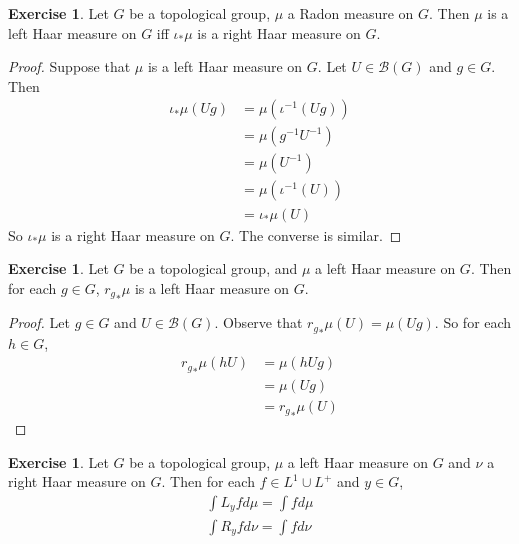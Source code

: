 \documentclass[12pt]{amsart}
\theoremstyle{definition}
\newtheorem{ex}[definition]{Exercise}
\newcommand{\MB}{\mathcal{B}}
\newcommand{\lex}[1]{\label{ex:#1}}
\begin{document}
	\begin{ex} \lex{00000} 
		Let $G$ be a topological group, $\mu$ a Radon measure on $G$. Then $\mu$ is a left Haar measure on $G$ iff $\iota_*\mu$ is a right Haar measure on $G$. 
	\end{ex}
	
	\begin{proof}
		Suppose that $\mu$ is a left Haar measure on $G$. Let $U \in \MB(G)$ and $g \in G$. Then 
		\begin{align*}
			\iota_*\mu(Ug)
			& = \mu(\iota^{-1}(Ug)) \\
			&= \mu (g^{-1}U^{-1}) \\
			&= \mu (U^{-1}) \\
			&= \mu(\iota^{-1}(U)) \\
			&= \iota_*\mu(U)
		\end{align*}
		So $\iota_*\mu$ is a right Haar measure on $G$. The converse is similar.
	\end{proof}

	\begin{ex} \lex{00000} 
		Let $G$ be a topological group, and $\mu$ a left Haar measure on $G$. Then for each $g \in G$, ${r_{g}}_*\mu$ is a left Haar measure on $G$.
	\end{ex}

	\begin{proof}
		Let $g \in G$ and $U \in \MB(G)$. Observe that ${r_{g}}_*\mu(U) = \mu(Ug)$. So for each $h \in G$, 
		\begin{align*}
			{r_{g}}_*\mu(hU) 
			& = \mu(hUg) \\
			& =  \mu(Ug) \\
			& = {r_{g}}_*\mu(U)
		\end{align*}
	\end{proof}
	
	\begin{ex} \lex{00000} 
		Let $G$ be a topological group, $\mu$ a left Haar measure on $G$ and $\nu$ a right Haar measure on $G$. Then for each $f \in L^1 \cup L^+$ and $y \in G$, 
		\begin{align}
			\int L_y f d\mu = \int f d\mu \\
			\int R_y f d\nu = \int f d\nu
		\end{align}
	\end{ex}
	
\end{document}
